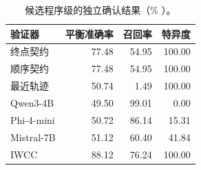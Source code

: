 \begin{table}[t]
\centering
\caption{候选程序级的独立确认结果（\% ）。}
\label{tab:main-zh}
\begin{tabular}{lrrr}
\toprule
验证器 & 平衡准确率 & 召回率 & 特异度 \\
\midrule
终点契约 & 77.48 & 54.95 & 100.00 \\
顺序契约 & 77.48 & 54.95 & 100.00 \\
最近轨迹 & 50.74 & 1.49 & 100.00 \\
Qwen3-4B & 49.50 & 99.01 & 0.00 \\
Phi-4-mini & 50.72 & 86.14 & 15.31 \\
Mistral-7B & 51.12 & 60.40 & 41.84 \\
IWCC & 88.12 & 76.24 & 100.00 \\
\bottomrule
\end{tabular}
\end{table}
